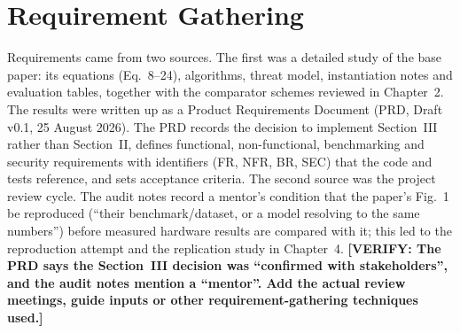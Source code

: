 \documentclass[12pt,a4paper,oneside]{report}
\numberwithin{equation}{chapter}
\newcommand{\VERIFY}[1]{\textcolor{orange!85!black}{\textbf{[VERIFY: #1]}}}
\begin{document}
\section{Requirement Gathering}
Requirements came from two sources. The first was a detailed study of the base paper: its equations (Eq.~8--24), algorithms, threat model, instantiation notes and evaluation tables, together with the comparator schemes reviewed in Chapter~2. The results were written up as a Product Requirements Document (PRD, Draft v0.1, 25 August 2026). The PRD records the decision to implement Section~III rather than Section~II, defines functional, non-functional, benchmarking and security requirements with identifiers (FR, NFR, BR, SEC) that the code and tests reference, and sets acceptance criteria. The second source was the project review cycle. The audit notes record a mentor's condition that the paper's Fig.~1 be reproduced (``their benchmark/dataset, or a model resolving to the same numbers'') before measured hardware results are compared with it; this led to the reproduction attempt and the replication study in Chapter~4. \VERIFY{The PRD says the Section~III decision was ``confirmed with stakeholders'', and the audit notes mention a ``mentor''. Add the actual review meetings, guide inputs or other requirement-gathering techniques used.}
\end{document}

